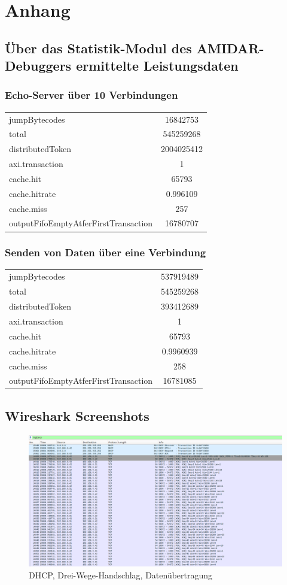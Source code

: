 
\chapter{Anhang}
\section{Über das Statistik-Modul des AMIDAR-Debuggers ermittelte Leistungsdaten}

\subsection{Echo-Server über 10 Verbindungen}
\begin{tabular}{lc}
jumpBytecodes & 16842753\\
total & 545259268 \\
distributedToken & 2004025412 \\
axi.transaction& 1\\
cache.hit & 65793\\
cache.hitrate& 0.996109\\
cache.miss& 257\\
outputFifoEmptyAtferFirstTransaction&16780707
\end{tabular}
\subsection{Senden von Daten über eine Verbindung}

\begin{tabular}{lc}
jumpBytecodes & 537919489\\
total & 545259268 \\
distributedToken & 393412689 \\
axi.transaction& 1\\
cache.hit & 65793\\
cache.hitrate& 0.9960939\\
cache.miss& 258\\
outputFifoEmptyAtferFirstTransaction & 16781085
\end{tabular}

\section{Wireshark Screenshots}
\begin{figure}
	\centering
	\includegraphics[width=1\textwidth]{Graphics/dhcpHD.png}
	\caption{DHCP, Drei-Wege-Handschlag, Datenübertragung}
\end{figure}

